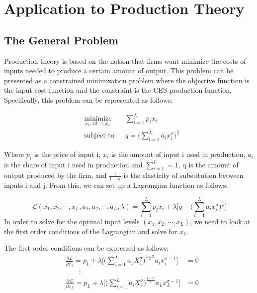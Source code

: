 \section{Application to Production Theory}
\subsection{The General Problem}
Production theory is based on the notion that firms want minimize the costs of inputs needed to produce a certain amount of output.  This problem can be presented as a constrained minimization problem where the objective function is the input cost function and the constraint is the CES production function. Specifically, this problem can be represented as follows:

\begin{equation*}
\begin{aligned}
& \underset{x_1, x2, \cdots , x_L}{\text{minimize}}
& & \sum_{l=1}^L p_ix_i \\
& \text{subject to}
& & q = \bigg( \sum_{l=1}^L a_ix_i^\sigma \bigg) ^{\frac{1}{\sigma}}
\end{aligned}
\end{equation*}

Where $p_i$ is the price of input i, $x_i$ is the amount of input i used in production, $a_i$ is the share of input i used in production and $\sum_{i=1}^L = 1$, q is the amount of output produced by the firm, and $\frac{1}{1- \sigma}$ is the elasticity of substitution between inputs i and j. From this, we can set up a Lagrangian function as follows:

\begin{equation*}
\mathcal{L}(x_1, x_2, \cdots , x_L , a_1, a_2, \cdots, a_L, \lambda) =\sum_{l=1}^L p_ix_i  + \lambda  \bigg[ q - \bigg( \sum_{l=1}^L a_ix_i^\sigma \bigg) ^{\frac{1}{\sigma}} \bigg]
\end{equation*}
In order to solve for the optimal input levels $(x_1, x_2, \cdots, x_L)$, we need to look at the first order conditions of the Lagrangian and solve for $x_{\ell}$.

The first order conditions can be expressed as follows:
\begin{equation*}
\begin{aligned}
& \frac{\partial \mathcal{L}}{\partial x_1} = p_1 + \lambda \bigg[\Big(\sum_{i=1}^L a_1X_1^\sigma \Big)^\frac{1-\sigma}{\sigma}a_ix_i^{\sigma - 1} \bigg] &= 0  \\
& \qquad\vdots \\
& \frac{\partial \mathcal{L}}{\partial x_{L}} = p_L + \lambda \bigg[\Big(\sum_{i=1}^L a_iX_i^\sigma \Big)^\frac{1 - \sigma}{\sigma} a_Lx_L^{\sigma - 1}\bigg] &= 0
\end{aligned}
\end{equation*}

